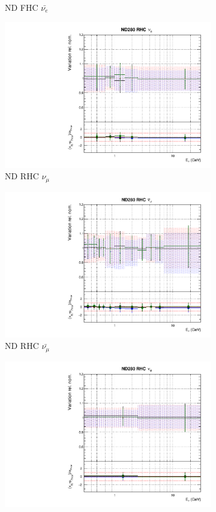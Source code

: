 \begin{figure}[t]
\begin{subfigure}{0.45\textwidth}
  \caption{ND FHC $\bar{\nu_{e}}$}
\end{subfigure}
\begin{subfigure}{0.45\textwidth}
  \centering
  \includegraphics[width=0.75\linewidth]{figs/hptpcfitsflux_4}
  \caption{ND RHC $\nu_{\mu}$}
\end{subfigure}
\begin{subfigure}{0.45\textwidth}
  \centering
  \includegraphics[width=0.75\linewidth]{figs/hptpcfitsflux_5}
  \caption{ND RHC $\bar{\nu_{\mu}}$}
\end{subfigure}
\begin{subfigure}{0.45\textwidth}
  \centering
  \includegraphics[width=0.75\linewidth]{figs/hptpcfitsflux_6}

\end{subfigure}
\end{figure}
